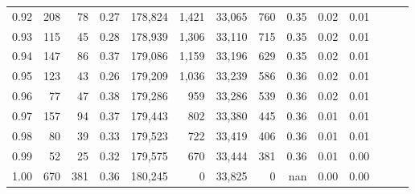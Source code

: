 \begin{tabular}{rrrrrrrrrrrrrr}
0.92 &    208 &   78 &  0.27 &  178,824 &    1,421 &  33,065 &     760 &  0.35 &  0.02 &      0.01 \\
0.93 &    115 &   45 &  0.28 &  178,939 &    1,306 &  33,110 &     715 &  0.35 &  0.02 &      0.01 \\
0.94 &    147 &   86 &  0.37 &  179,086 &    1,159 &  33,196 &     629 &  0.35 &  0.02 &      0.01 \\
0.95 &    123 &   43 &  0.26 &  179,209 &    1,036 &  33,239 &     586 &  0.36 &  0.02 &      0.01 \\
0.96 &     77 &   47 &  0.38 &  179,286 &      959 &  33,286 &     539 &  0.36 &  0.02 &      0.01 \\
0.97 &    157 &   94 &  0.37 &  179,443 &      802 &  33,380 &     445 &  0.36 &  0.01 &      0.01 \\
0.98 &     80 &   39 &  0.33 &  179,523 &      722 &  33,419 &     406 &  0.36 &  0.01 &      0.01 \\
0.99 &     52 &   25 &  0.32 &  179,575 &      670 &  33,444 &     381 &  0.36 &  0.01 &      0.00 \\
1.00 &    670 &  381 &  0.36 &  180,245 &        0 &  33,825 &       0 &   nan &  0.00 &      0.00 \\
\bottomrule
\end{tabular}
